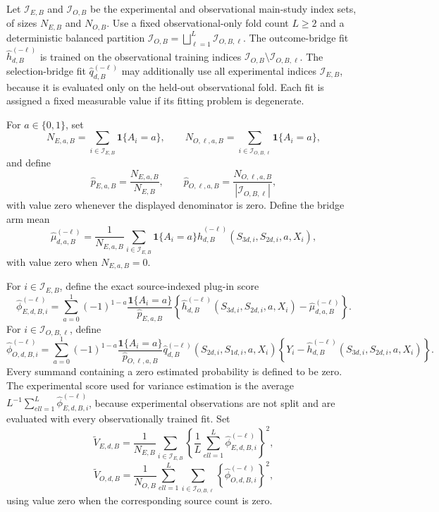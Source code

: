 Let \(\mathcal I_{E,B}\) and \(\mathcal I_{O,B}\) be the experimental and observational main-study index sets, of sizes \(N_{E,B}\) and \(N_{O,B}\). Use a fixed observational-only fold count \(L\ge2\) and a deterministic balanced partition \(\mathcal I_{O,B}=\bigsqcup_{\ell=1}^L\mathcal I_{O,B,\ell}\). The outcome-bridge fit \(\widehat h_{d,B}^{(-\ell)}\) is trained on the observational training indices \(\mathcal I_{O,B}\setminus\mathcal I_{O,B,\ell}\). The selection-bridge fit \(\widehat q_{d,B}^{(-\ell)}\) may additionally use all experimental indices \(\mathcal I_{E,B}\), because it is evaluated only on the held-out observational fold. Each fit is assigned a fixed measurable value if its fitting problem is degenerate.

For \(a\in\{0,1\}\), set
\[
 N_{E,a,B}=\sum_{i\in\mathcal I_{E,B}}\mathbf 1\{A_i=a\},
 \qquad
 N_{O,\ell,a,B}=\sum_{i\in\mathcal I_{O,B,\ell}}\mathbf 1\{A_i=a\},
\]
and define
\[
 \widehat p_{E,a,B}=\frac{N_{E,a,B}}{N_{E,B}},
 \qquad
 \widehat p_{O,\ell,a,B}
 =\frac{N_{O,\ell,a,B}}{|\mathcal I_{O,B,\ell}|},
\]
with value zero whenever the displayed denominator is zero. Define the bridge arm mean
\[
 \widehat\mu_{d,a,B}^{(-\ell)}
 =\frac{1}{N_{E,a,B}}
 \sum_{i\in\mathcal I_{E,B}}\mathbf 1\{A_i=a\}
 \widehat h_{d,B}^{(-\ell)}(S_{3d,i},S_{2d,i},a,X_i),
\]
with value zero when \(N_{E,a,B}=0\).

For \(i\in\mathcal I_{E,B}\), define the exact source-indexed plug-in score
\[
 \widehat\phi_{E,d,B,i}^{(-\ell)}
 =\sum_{a=0}^1(-1)^{1-a}
 \frac{\mathbf 1\{A_i=a\}}{\widehat p_{E,a,B}}
 \left\{\widehat h_{d,B}^{(-\ell)}(S_{3d,i},S_{2d,i},a,X_i)
 -\widehat\mu_{d,a,B}^{(-\ell)}\right\}.
\]
For \(i\in\mathcal I_{O,B,\ell}\), define
\[
 \widehat\phi_{O,d,B,i}^{(-\ell)}
 =\sum_{a=0}^1(-1)^{1-a}
 \frac{\mathbf 1\{A_i=a\}}{\widehat p_{O,\ell,a,B}}
 \widehat q_{d,B}^{(-\ell)}(S_{2d,i},S_{1d,i},a,X_i)
 \left\{Y_i-\widehat h_{d,B}^{(-\ell)}(S_{3d,i},S_{2d,i},a,X_i)\right\}.
\]
Every summand containing a zero estimated probability is defined to be zero. The experimental score used for variance estimation is the average \(L^{-1}\sum_{ell=1}^L\widehat\phi_{E,d,B,i}^{(-\ell)}\), because experimental observations are not split and are evaluated with every observationally trained fit. Set
\[
 \widetilde V_{E,d,B}
 =\frac1{N_{E,B}}\sum_{i\in\mathcal I_{E,B}}
 \left\{\frac1L\sum_{ell=1}^L
 \widehat\phi_{E,d,B,i}^{(-\ell)}\right\}^2,
\]
\[
 \widetilde V_{O,d,B}
 =\frac1{N_{O,B}}\sum_{ell=1}^L
 \sum_{i\in\mathcal I_{O,B,\ell}}
 \left\{\widehat\phi_{O,d,B,i}^{(-\ell)}\right\}^2,
\]
using value zero when the corresponding source count is zero.

